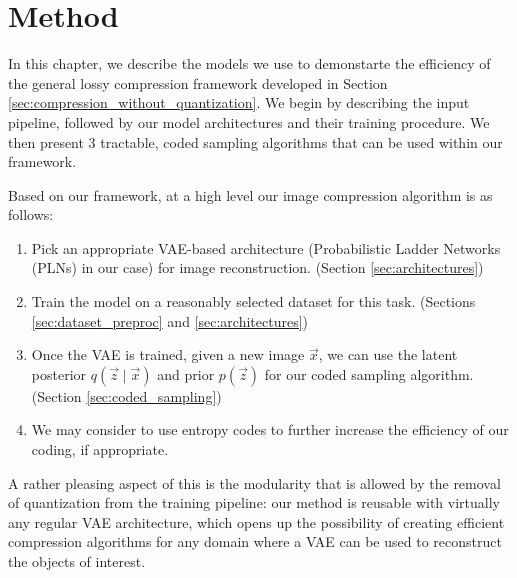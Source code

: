 
\chapter{Method}
\label{chapter:method}

\graphicspath{{../img/thesis/}{../img/plots/vae_latents/}{../img/related_works/}}

\par
In this chapter, we describe the models we use to demonstarte the efficiency of the
general lossy compression framework developed in Section
\ref{sec:compression_without_quantization}. We begin by describing the input
pipeline, followed by our model architectures and their training procedure. We
then present 3 tractable, coded sampling algorithms that can be used within our
framework.

Based on our framework, at a high level our image compression algorithm is as
follows:

\begin{framed}
\begin{enumerate}
\item Pick an appropriate VAE-based architecture (Probabilistic Ladder Networks
  (PLNs) in our case) for image reconstruction. (Section \ref{sec:architectures})

\item Train the model on a reasonably selected dataset for this task. (Sections
  \ref{sec:dataset_preproc} and \ref{sec:architectures})

\item Once the VAE is trained, given a new image
  $\vec{x}$, we can use the latent posterior $q(\vec{z} \mid \vec{x})$ and
  prior $p(\vec{z})$ for our coded sampling algorithm. (Section
  \ref{sec:coded_sampling})

\item We may consider to use entropy codes to further increase the efficiency of
  our coding, if appropriate. 

\end{enumerate}
\end{framed}

\par
A rather pleasing aspect of this is the modularity that is allowed by the
removal of quantization from the training pipeline: our method is reusable with
virtually any regular VAE architecture, which opens up the possibility of
creating efficient compression algorithms for any domain where a VAE can be used
to reconstruct the objects of interest. 

